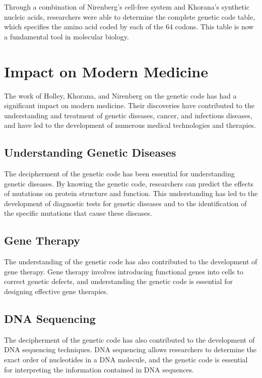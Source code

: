 Through a combination of Nirenberg's cell-free system and Khorana's synthetic nucleic acids, researchers were able to determine the complete genetic code table, which specifies the amino acid coded by each of the 64 codons. This table is now a fundamental tool in molecular biology.

\section{Impact on Modern Medicine}

The work of Holley, Khorana, and Nirenberg on the genetic code has had a significant impact on modern medicine. Their discoveries have contributed to the understanding and treatment of genetic diseases, cancer, and infectious diseases, and have led to the development of numerous medical technologies and therapies.

\subsection{Understanding Genetic Diseases}

The decipherment of the genetic code has been essential for understanding genetic diseases. By knowing the genetic code, researchers can predict the effects of mutations on protein structure and function. This understanding has led to the development of diagnostic tests for genetic diseases and to the identification of the specific mutations that cause these diseases.

\subsection{Gene Therapy}

The understanding of the genetic code has also contributed to the development of gene therapy. Gene therapy involves introducing functional genes into cells to correct genetic defects, and understanding the genetic code is essential for designing effective gene therapies.

\subsection{DNA Sequencing}

The decipherment of the genetic code has also contributed to the development of DNA sequencing techniques. DNA sequencing allows researchers to determine the exact order of nucleotides in a DNA molecule, and the genetic code is essential for interpreting the information contained in DNA sequences.

